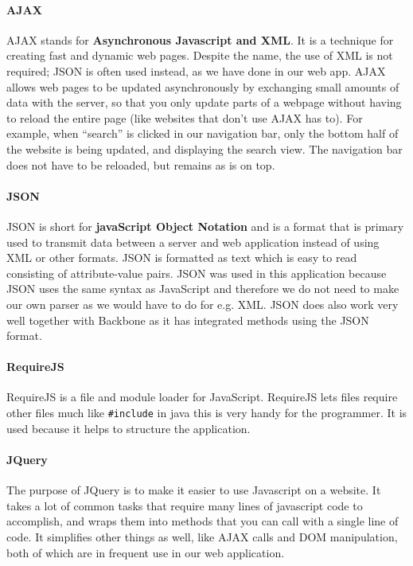 \paragraph{AJAX}
AJAX\cite{web_3} stands for \textbf{Asynchronous Javascript and XML}. It is a technique for creating fast and dynamic web pages. Despite the name, the use of XML is not required; JSON is often used instead, as we have done in our web app. AJAX allows web pages to be updated asynchronously by exchanging small amounts of data with the server, so that you only update parts of a webpage without having to reload the entire page (like websites that don’t use AJAX has to). For example, when “search” is clicked in our navigation bar, only the bottom half of the website is being updated, and displaying the search view. The navigation bar does not have to be reloaded, but remains as is on top.

\paragraph{JSON}
JSON\cite{web_4} is short for \textbf{javaScript Object Notation} and is a format that is primary used to transmit data between a server and web application instead of using XML or other formats.
JSON is formatted as text which is easy to read consisting of attribute-value pairs.
JSON was used in this application because JSON uses the same syntax as JavaScript and therefore we do not need to make our own parser as we would have to do for e.g. XML. JSON does also work very well together with Backbone as it has integrated methods using the JSON format.

\paragraph{RequireJS}
RequireJS\cite{web_5} is a file and module loader for JavaScript. RequireJS lets files require other files much like \texttt{\#include} in java this is very handy for the programmer. It is used because it helps to structure the application.
\paragraph{JQuery}
The purpose of JQuery\cite{web_6} is to make it easier to use Javascript on a website. It takes a lot of common tasks that require many lines of javascript code to accomplish, and wraps them into methods that you can call with a single line of code. It simplifies other things as well, like AJAX calls and DOM manipulation, both of which are in frequent use in our web application.
